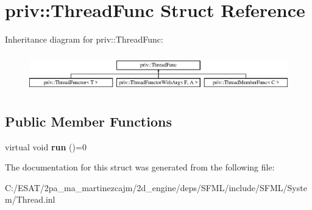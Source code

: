 \hypertarget{structpriv_1_1_thread_func}{}\section{priv\+:\+:Thread\+Func Struct Reference}
\label{structpriv_1_1_thread_func}
Inheritance diagram for priv\+:\+:Thread\+Func\+:\begin{figure}[H]
\begin{center}
\leavevmode
\includegraphics[height=1.644640cm]{structpriv_1_1_thread_func}
\end{center}
\end{figure}
\subsection*{Public Member Functions}
\begin{DoxyCompactItemize}
\item 
\mbox{\label{structpriv_1_1_thread_func_ab5465e714ca4aa92a09bf5e24410a5c3}} 
virtual void {\bfseries run} ()=0
\end{DoxyCompactItemize}


The documentation for this struct was generated from the following file\+:\begin{DoxyCompactItemize}
\item 
C\+:/\+E\+S\+A\+T/2pa\+\_\+ma\+\_\+martinezcajm/2d\+\_\+engine/deps/\+S\+F\+M\+L/include/\+S\+F\+M\+L/\+System/Thread.\+inl\end{DoxyCompactItemize}
